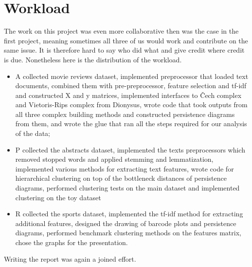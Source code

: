 \section{Workload}
\label{sec:workload}

The work on this project was even more collaborative then was the case in the
first project, meaning sometimes all three of us would work and contribute on
the same issue. It is therefore hard to say who did what and give credit where
credit is due. Nonetheless here is the distribution of the workload.

\begin{itemize}
  \item A collected movie reviews dataset, implemented preprocessor that loaded
    text documents, combined them with pre-preprocessor, feature selection and
    tf-idf and constructed X and y matrices, implemented interfaces to Čech
    complex and Vietoris-Rips complex from Dionysus, wrote code that took
    outputs from all three complex building methods and constructed persistence
    diagrams from them, and wrote the glue that ran all the steps required for
    our analysis of the data;
  \item P collected the abstracts dataset, implemented the texts preprocessors which
    removed stopped words and applied stemming and lemmatization, implemented various
    methods for extracting text features, wrote code for hierarchical clustering on top
    of the bottleneck distances of persistence diagrams, performed clustering tests on
    the main dataset and implemented clustering on the toy dataset
  \item R collected the sports dataset, implemented the tf-idf method for
    extracting additional features, designed the drawing of barcode plots and
    persistence diagrams, performed benchmark clustering methods on the
    features matrix, chose the graphs for the presentation.
\end{itemize}

Writing the report was again a joined effort.
